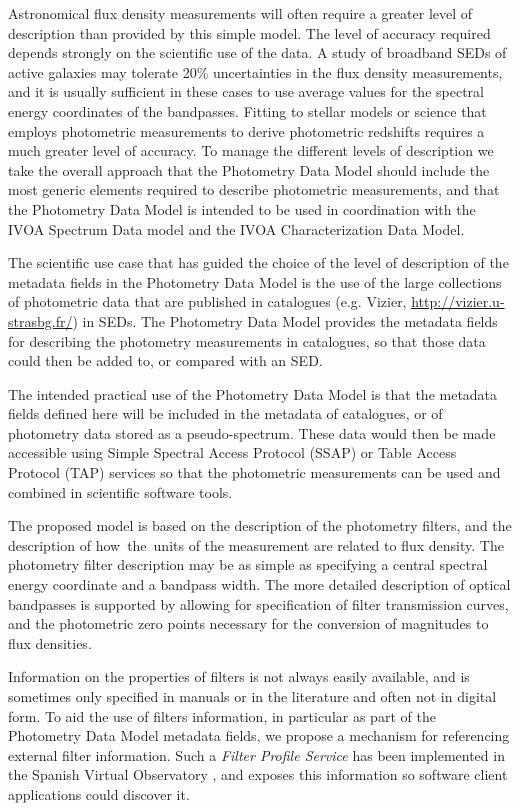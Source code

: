 \documentclass[11pt,a4paper]{ivoa}
\begin{document}
Astronomical flux density measurements will often require a
greater level of description than provided by this simple model.
The level of accuracy required depends strongly on the scientific
use of the data. A study of broadband SEDs of active galaxies may
tolerate 20$\%$  uncertainties in the flux density measurements,
and it is usually sufficient in these cases to use average values
for the spectral energy coordinates of the bandpasses. Fitting to
stellar models or science that employs photometric measurements to
derive photometric redshifts requires a much greater level of accuracy.
To manage the different levels of description we take the overall
approach that the Photometry Data Model should include the most
generic elements required to describe photometric measurements,
and that the Photometry Data Model is intended to be used in
coordination with the IVOA Spectrum Data model and the IVOA
Characterization Data Model.

The scientific use case that has guided the choice of the level
of description of the metadata fields in the Photometry Data Model
is the use of the large collections of photometric data that are
published in catalogues (e.g. Vizier, \url{http://vizier.u-strasbg.fr/})
in SEDs. The Photometry Data Model provides the metadata fields for
describing the photometry measurements in catalogues, so that those
data could then be added to, or compared with an SED.

The intended practical use of the Photometry Data Model is that the
metadata fields defined here will be included in the metadata of
catalogues, or of photometry data stored as a pseudo-spectrum. These
data would then be made accessible using Simple Spectral Access Protocol
(SSAP) or Table Access Protocol (TAP) services so that the photometric
measurements can be used and combined in scientific software tools.

The proposed model is based on the description of the photometry
filters, and the description of how\ the\ units of the measurement
are related to flux density. The photometry filter description may
be as simple as specifying a central spectral energy coordinate and
a bandpass width. The more detailed description of optical bandpasses
is supported by allowing for specification of filter transmission
curves, and the   photometric zero points necessary for the conversion
of magnitudes to flux densities.

Information on the properties of filters is not always easily available,
and is sometimes only specified in manuals or in the literature and often
not in digital form. To aid the use of filters information, in particular
as part of the Photometry Data Model metadata fields, we propose a
mechanism for referencing external filter information. Such a
\textit{Filter Profile Service} has been implemented in the Spanish Virtual Observatory
\citep{2012ivoa.rept.1015R}, \citep{2020sea..confE.182R} and exposes this information so software
client applications could discover it.
\end{document}
